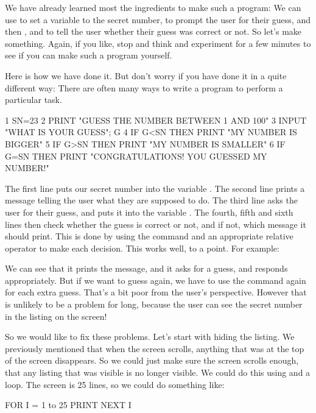We have already learned most the ingredients to make such a program: We
can use  to set a variable to the secret number, 
to prompt the user for their guess, and then ,  and
 to tell the user whether their guess was correct or not.
So let's make something. Again, if you like, stop and think and
experiment for a few minutes to see if you can make such a program
yourself.

Here is how we have done it.  But don't worry if you have done it in a
quite different way: There are often many ways to write a program to
perform a particular task.

\begin{screenoutput}
1 SN=23
2 PRINT "GUESS THE NUMBER BETWEEN 1 AND 100"
3 INPUT "WHAT IS YOUR GUESS"; G
4 IF G<SN THEN PRINT "MY NUMBER IS BIGGER"
5 IF G>SN THEN PRINT "MY NUMBER IS SMALLER"
6 IF G=SN THEN PRINT "CONGRATULATIONS! YOU GUESSED MY NUMBER!"
\end{screenoutput}

\needspace{4cm}
The first line puts our secret number into the variable .
The second line prints a message telling the user what they are
supposed to do. The third line asks the user for their guess, and puts
it into the variable . The
fourth, fifth and sixth lines then check whether the guess is correct
or not, and if not, which message it should print. This is done by
using the  command and an appropriate relative operator to
make each decision.  This works well, to a point. For example:


We can see that it prints the message, and it asks for a guess, and
responds appropriately. But if we want to guess again, we have to use
the  command again for each extra guess. That's a bit poor
from the user's perspective. However that is unlikely to be a problem
for long, because the user can see the secret number in the listing on
the screen!

So we would like to fix these problems.  Let's start with hiding the
listing.  We previously mentioned that when the screen scrolls,
anything that was at the top of the screen disappears.  So we could
just make sure the screen scrolls enough, that any listing that was
visible is no longer visible. We could do this using  and a
 loop.  The screen is 25 lines, so we could do something
like:

\begin{screenoutput}
FOR I = 1 to 25
PRINT
NEXT I
\end{screenoutput}

